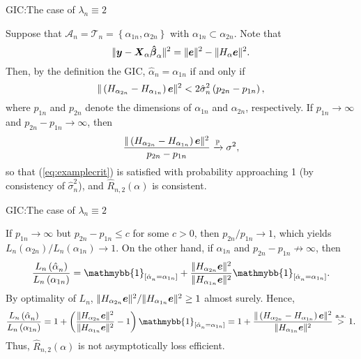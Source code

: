 \documentclass{beamer}
\newcommand{\0}{\emptyset}
\newcommand{\prob}{\mathbb{P}}
\newcommand{\paren}[1]{\left(#1 \right)}
\newcommand{\sqbr}[1]{\left[#1 \right]}
\newcommand{\set}[1]{\left\{ #1 \right\}}
\newcommand{\norm}[1]{|\hspace{-1pt}|#1 |\hspace{-1pt}|}
\newcommand{\normsq}[1]{\norm{#1}^{2}}
\newcommand{\ind}[1]{\mathmybb{1}_{\sqbr{#1}}}
\newcommand{\Acal}{\mathcal{A}_{n}}
\newcommand{\Tcal}{\mathcal{T}_{n}}
\newcommand{\X}{\boldsymbol{X}}
\newcommand{\y}{\boldsymbol{y}}
\newcommand{\e}{\boldsymbol{e}}
\newcommand{\bbetahat}{\boldsymbol{\hat{\beta}}}
\newcommand{\Loss}[1]{L_{n}\paren{#1}}
\newcommand{\Rhat}[2]{\hat{R}_{n, #1}\paren{#2}}
\newcommand{\alphahat}[1]{\hat{\alpha}^{#1}}
\newcommand{\sigmahat}{\hat{\sigma}^{2}_{n}}
\newcommand{\1}{\mathmybb{1}}
\begin{document}
\begin{frame}{GIC:\@ The case of \(\lambda_{n} \equiv 2\)}
  \begin{example}
    Suppose that \(\Acal = \Tcal = \set{\alpha_{1n}, \alpha_{2n}}\) with \(\alpha_{1n}\subset\alpha_{2n}\). Note that 
      \[\normsq{\y - \X_{\alpha}\bbetahat_{\alpha}} = \normsq{\e} - \normsq{H_{\alpha}\e}.\]
      Then, by the definition the GIC, \(\alphahat{}_{n} = \alpha_{1n}\) if and only if
      \begin{equation}\label{eq:examplecrit}
      \normsq{\paren{H_{\alpha_{2n}} - H_{\alpha_{1n}}}\e} < 2\sigmahat\paren{p_{2n}-p_{1n}},
      \end{equation}
      where \(p_{1n}\) and \(p_{2n}\) denote the dimensions of \(\alpha_{1n}\) and \(\alpha_{2n}\), respectively. If \(p_{1n}\to\infty\) and \(p_{2n} - p_{1n}\to\infty\), then
      \[\frac{\normsq{\paren{H_{\alpha_{2n}} - H_{\alpha_{1n}}}\e}}{p_{2n} - p_{1n}}\xrightarrow{\prob}\sigma^{2},\]
      so that (\ref{eq:examplecrit}) is satisfied with probability approaching 1 (by consistency of \(\sigmahat\)), and \(\Rhat{2}{\alpha}\) is consistent.
  \end{example}
\end{frame}

\begin{frame}{GIC:\@ The case of \(\lambda_{n} \equiv 2\)}
  \begin{example}
    If \(p_{1n}\to\infty\) but \(p_{2n} - p_{1n}\leq c\) for some \(c>0\), then \(p_{2n} / p_{1n}\to 1\), which yields \(\Loss{\alpha_{2n}}/\Loss{\alpha_{1n}} \to 1\). On the other hand, if \(\alpha_{1n}\) and \(p_{2n} - p_{1n}\not\to\infty\), then
    \[\frac{\Loss{\alphahat{}_{n}}}{\Loss{\alpha_{1n}}} = \ind{\alphahat{}_{n}=\alpha_{1n}} + \frac{\normsq{H_{\alpha_{2n}}\e}}{\normsq{H_{\alpha_{1n}}\e}}\ind{\alphahat{}_{n}=\alpha_{1n}}.\]
    By optimality of \(L_{n}\), \({\normsq{H_{\alpha_{2n}}\e}}/{\normsq{H_{\alpha_{1n}}\e}}\geq1\) almost surely. Hence,
    \[\frac{\Loss{\alphahat{}_{n}}}{\Loss{\alpha_{1n}}} = 1 + \paren{\frac{\normsq{H_{\alpha_{2n}}\e}}{\normsq{H_{\alpha_{1n}}\e}} - 1}\ind{\alphahat{}_{n}=\alpha_{1n}} = 1 + \frac{\normsq{\paren{H_{\alpha_{2n}} - H_{\alpha_{1n}}}\e}}{\normsq{H_{\alpha_{1n}}\e}} \stackrel{\mathrm{a.s.}}{>} 1.\]
    Thus, \(\Rhat{2}{\alpha}\) is not asymptotically loss efficient.    
  \end{example}
\end{frame}
\end{document}
